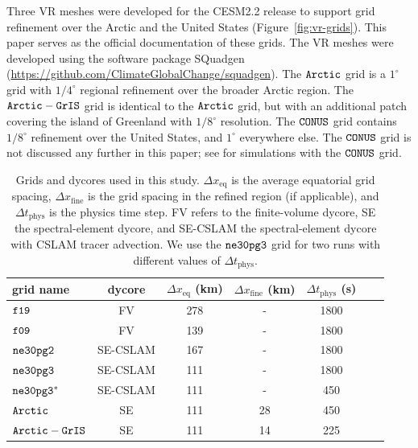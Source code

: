 \documentclass[draft]{agujournal2019}
\begin{document}
Three VR meshes were developed for the CESM2.2 release to support grid refinement over the Arctic and the United States (Figure~\ref{fig:vr-grids}). This paper serves as the official documentation of these grids. The VR meshes were developed using the software package SQuadgen (\url{https://github.com/ClimateGlobalChange/squadgen}). The $\tt Arctic$ grid is a $1^{\circ}$ grid with $1/4^{\circ}$ regional refinement over the broader Arctic region. The $\tt Arctic-GrIS$ grid is identical to the $\tt Arctic$ grid, but with an additional patch covering the island of Greenland with $1/8^{\circ}$ resolution. The $\tt CONUS$ grid contains $1/8^{\circ}$ refinement over the United States, and $1^{\circ}$ everywhere else. The $\tt CONUS$ grid is not discussed any further in this paper; see  for simulations with the $\tt CONUS$ grid.

 \begin{table}
 \centering
 \scriptsize
 \begin{tabular}{lcccccc}
   \hline
   grid name & dycore & $\Delta x_{\mathrm{eq}}$ (km) & $\Delta x_{\mathrm{fine}}$ (km) & $\Delta t_{\mathrm{phys}}$ (s) & {\color{blue}{cost(25 nodes)}} & {\color{blue}{cost(50 nodes)}} \\ 
   \hline
   $\tt f19$ & FV & 278 & - &1800 & {\color{blue}{436.66}} & {\color{blue}{-}} \\
   $\tt f09$ & FV & 139 & - &1800 & {\color{blue}{1534.57}} & {\color{blue}{2024.24}} \\
   $\tt ne30pg2$ & SE-CSLAM & 167 & - & 1800 & {\color{blue}{1497.26}} & {\color{blue}{1683.97}} \\
   $\tt ne30pg3$ & SE-CSLAM & 111 & - & 1800 & {\color{blue}{1890.48}} & {\color{blue}{2090.43}} \\
   $\tt ne30pg3^{*}$ & SE-CSLAM & 111 & - & 450 & {\color{blue}{-}} & {\color{blue}{-}} \\
   $\tt Arctic$ & SE & 111 & 28 & 450 & {\color{blue}{15947.41}} & {\color{blue}{16675.45}} \\
   $\tt Arctic-GrIS$ & SE & 111 & 14 & 225 & {\color{blue}{40305.03}} & {\color{blue}{41036.67}} \\
 \hline
 \end{tabular}
  \caption{Grids and dycores used in this study. $\Delta x_{\mathrm{eq}}$ is the average equatorial grid spacing, $\Delta x_{\mathrm{fine}}$ is the grid spacing in the refined region (if applicable), and $\Delta t_{\mathrm{phys}}$ is the physics time step. FV refers to the finite-volume dycore, SE the spectral-element dycore, and SE-CSLAM the spectral-element dycore with CSLAM tracer advection.  We use the $\tt ne30pg3$ grid for two runs with different values of $\Delta t_{\mathrm{phys}}$. {}}
 \label{tbl:table1}
 \end{table}
\end{document}
